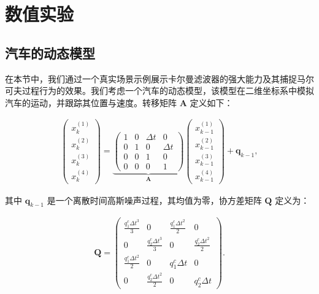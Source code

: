 
\chapter{数值实验}

\section{汽车的动态模型}

在本节中，我们通过一个真实场景示例展示卡尔曼滤波器的强大能力及其捕捉马尔可夫过程行为的效果。我们考虑一个汽车的动态模型，该模型在二维坐标系中模拟汽车的运动，并跟踪其位置与速度。转移矩阵 \(\mathbf{A}\) 定义如下：

\begin{align}
    \begin{pmatrix}
        x_k^{(1)} \\
        x_k^{(2)} \\
        x_k^{(3)} \\
        x_k^{(4)}
    \end{pmatrix} = \underbrace{
    \begin{pmatrix}
    1 & 0 & \Delta t & 0 \\
    0 & 1 & 0 & \Delta t \\
    0 & 0 & 1 & 0 \\
    0 & 0 & 0 & 1
    \end{pmatrix}}_{\mathbf{A}}
    \begin{pmatrix}
    x_{k-1}^{(1)} \\
    x_{k-1}^{(2)} \\
    x_{k-1}^{(3)} \\
    x_{k-1}^{(4)}
    \end{pmatrix}
    +
    \mathbf{q}_{k-1}, \label{eq: exp car A}
\end{align}

其中 \(\mathbf{q}_{k-1}\) 是一个离散时间高斯噪声过程，其均值为零，协方差矩阵 \(\mathbf{Q}\) 定义为：

\begin{align}
    \mathbf{Q} = 
    \begin{pmatrix}
    \frac{q_{1}^c \Delta t^3}{3} & 0 & \frac{q_{1}^c \Delta t^2}{2} & 0 \\
    0 & \frac{q_{2}^c \Delta t^3}{3} & 0 & \frac{q_{2}^c \Delta t^2}{2} \\
    \frac{q_{1}^c \Delta t^2}{2} & 0 & q_{1}^c \Delta t & 0 \\
    0 & \frac{q_{2}^c \Delta t^2}{2} & 0 & q_{2}^c \Delta t
    \end{pmatrix}.
\end{align}

